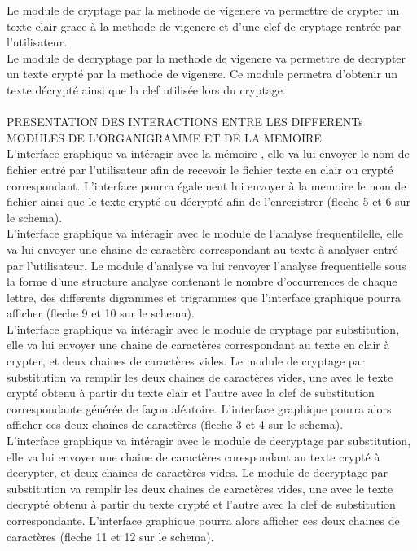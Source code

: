 \documentclass[a4]{article}
\begin{document}
	Le module de cryptage par la methode de vigenere va permettre de crypter un texte clair grace à la methode de vigenere
	 et d'une clef de cryptage rentrée par l'utilisateur. \\

	Le module de decryptage par la methode de vigenere va permettre de decrypter un texte crypté par la methode de vigenere. 
	Ce module permetra d'obtenir un texte décrypté ainsi que la clef utilisée lors du cryptage. \\ \\

	
PRESENTATION DES INTERACTIONS ENTRE LES DIFFERENTs MODULES DE L'ORGANIGRAMME ET DE LA MEMOIRE. \\

	L'interface graphique va intéragir avec la mémoire , elle va lui envoyer le nom de fichier entré par l'utilisateur 
	afin de recevoir le fichier texte en clair ou crypté correspondant. L'interface pourra également lui envoyer à la 
	memoire le nom de fichier ainsi que le texte crypté ou décrypté afin de l'enregistrer (fleche 5 et 6 sur le schema). \\

	L'interface graphique va intéragir avec le module de l'analyse frequentilelle, elle va lui envoyer une chaine de 
	caractère correspondant au texte à analyser entré par l'utilisateur. Le module d'analyse va lui renvoyer l'analyse 
	frequentielle sous la forme d'une structure analyse contenant le nombre d'occurrences de chaque lettre, des differents
	 digrammes et trigrammes que l'interface graphique pourra afficher (fleche 9 et 10 sur le schema). \\

	L'interface graphique va intéragir avec le module de cryptage par substitution, elle va lui envoyer une 
	chaine de caractères correspondant au texte en clair à crypter, et deux chaines de caractères vides. Le module
	 de cryptage par substitution va remplir les deux chaines de caractères vides, une avec le texte crypté obtenu
	  à partir du texte clair et l'autre avec la clef de substitution correspondante générée de façon aléatoire.
	   L'interface graphique pourra alors afficher ces deux chaines de caractères (fleche 3 et 4 sur le schema). \\

	L'interface graphique va intéragir avec le module de decryptage par substitution, elle va lui envoyer une 
	chaine de caractères corespondant au texte crypté à decrypter, et deux chaines de caractères vides. Le module 
	de decryptage par substitution va remplir les deux chaines de caractères vides, une avec le texte decrypté obtenu
	 à partir du texte crypté et l'autre avec la clef de substitution correspondante. L'interface graphique pourra 
	 alors afficher ces deux chaines de caractères (fleche 11 et 12 sur le schema). \\
\end{document}
